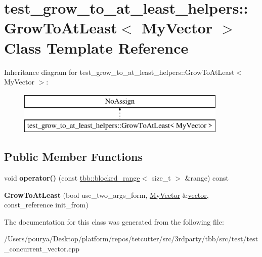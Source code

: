 \hypertarget{classtest__grow__to__at__least__helpers_1_1GrowToAtLeast}{}\section{test\+\_\+grow\+\_\+to\+\_\+at\+\_\+least\+\_\+helpers\+:\+:Grow\+To\+At\+Least$<$ My\+Vector $>$ Class Template Reference}
\label{classtest__grow__to__at__least__helpers_1_1GrowToAtLeast}
Inheritance diagram for test\+\_\+grow\+\_\+to\+\_\+at\+\_\+least\+\_\+helpers\+:\+:Grow\+To\+At\+Least$<$ My\+Vector $>$\+:\begin{figure}[H]
\begin{center}
\leavevmode
\includegraphics[height=2.000000cm]{classtest__grow__to__at__least__helpers_1_1GrowToAtLeast}
\end{center}
\end{figure}
\subsection*{Public Member Functions}
\begin{DoxyCompactItemize}
\item 
\hypertarget{classtest__grow__to__at__least__helpers_1_1GrowToAtLeast_a2d3b1d3f10be06b2c1aab2c3b0f190cf}{}void {\bfseries operator()} (const \hyperlink{classtbb_1_1blocked__range}{tbb\+::blocked\+\_\+range}$<$ size\+\_\+t $>$ \&range) const \label{classtest__grow__to__at__least__helpers_1_1GrowToAtLeast_a2d3b1d3f10be06b2c1aab2c3b0f190cf}

\item 
\hypertarget{classtest__grow__to__at__least__helpers_1_1GrowToAtLeast_a2b888c5b9e46afa824b4bf2966765417}{}{\bfseries Grow\+To\+At\+Least} (bool use\+\_\+two\+\_\+args\+\_\+form, \hyperlink{classtbb_1_1concurrent__vector}{My\+Vector} \&\hyperlink{structvector}{vector}, const\+\_\+reference init\+\_\+from)\label{classtest__grow__to__at__least__helpers_1_1GrowToAtLeast_a2b888c5b9e46afa824b4bf2966765417}

\end{DoxyCompactItemize}


The documentation for this class was generated from the following file\+:\begin{DoxyCompactItemize}
\item 
/\+Users/pourya/\+Desktop/platform/repos/tetcutter/src/3rdparty/tbb/src/test/test\+\_\+concurrent\+\_\+vector.\+cpp\end{DoxyCompactItemize}
